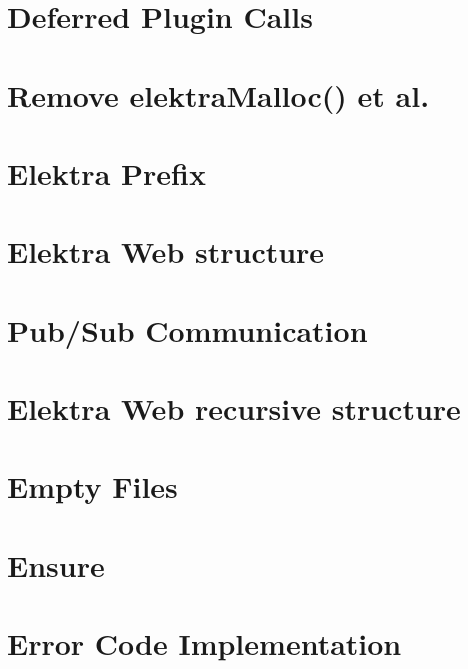 \let\mypdfximage\pdfximage\def\pdfximage{\immediate\mypdfximage}\documentclass[twoside]{book}
\newcommand{\+}{\discretionary{\mbox{\scriptsize$\hookleftarrow$}}{}{}}
\begin{document}
\chapter{Deferred Plugin Calls}
\label{doc_decisions_deferred_plugin_calls_md}

\chapter{Remove elektra\+Malloc() et al.}
\label{doc_decisions_elektra_malloc_md}

\chapter{Elektra Prefix}
\label{doc_decisions_elektra_prefix_md}

\chapter{Elektra Web structure}
\label{doc_decisions_elektra_web_md}

\chapter{Pub/\+Sub Communication}
\label{doc_decisions_elektra_web_pubsub_md}

\chapter{Elektra Web recursive structure}
\label{doc_decisions_elektra_web_recursive_md}

\chapter{Empty Files}
\label{doc_decisions_empty_files_md}

\chapter{Ensure}
\label{doc_decisions_ensure_md}

\chapter{Error Code Implementation}
\label{doc_decisions_error_code_implementation_md}

\end{document}

